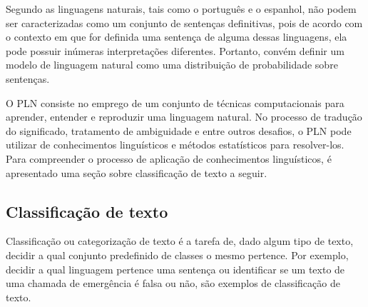 Segundo \cite{russell1994inteligencia} as linguagens naturais, tais como o português e o espanhol, não podem ser caracterizadas como um conjunto de sentenças definitivas, pois de acordo com o contexto em que for definida uma sentença de alguma dessas linguagens, ela pode possuir inúmeras interpretações diferentes. Portanto, convém definir um modelo de linguagem natural como uma distribuição de probabilidade sobre sentenças.

O PLN consiste no emprego de um conjunto de técnicas computacionais para aprender, entender e reproduzir uma linguagem natural. No processo de tradução do significado, tratamento de ambiguidade e entre outros desafios, o PLN pode utilizar de conhecimentos linguísticos e métodos estatísticos para resolver-los. Para compreender o processo de aplicação de conhecimentos linguísticos, é apresentado uma seção sobre classificação de texto a seguir.

\subsection{Classificação de texto}
Classificação ou categorização de texto é a tarefa de, dado algum tipo de texto, decidir a qual conjunto predefinido de classes o mesmo pertence. Por exemplo, decidir a qual linguagem pertence uma sentença ou identificar se um texto de uma chamada de emergência é falsa ou não, são exemplos de classificação de texto.